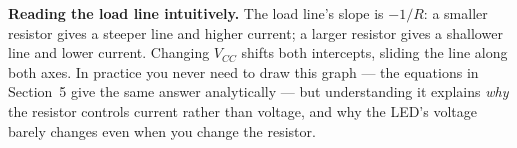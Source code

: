 \documentclass[11pt,letterpaper]{article}
\newcommand{\Vf}{V_f}
\newcommand{\Vcc}{V_{CC}}
\begin{document}
%			
%			
%			
%			
%			

\begin{tipbox}
	\textbf{Reading the load line intuitively.} The load line's slope is $-1/R$: a
	smaller resistor gives a steeper line and higher current; a larger resistor gives a
	shallower line and lower current. Changing $\Vcc$ shifts both intercepts, sliding
	the line along both axes. In practice you never need to draw this graph --- the
	equations in Section~5 give the same answer analytically --- but understanding it
	explains \emph{why} the resistor controls current rather than voltage, and why the
	LED's voltage barely changes even when you change the resistor.
\end{tipbox}
\end{document}
